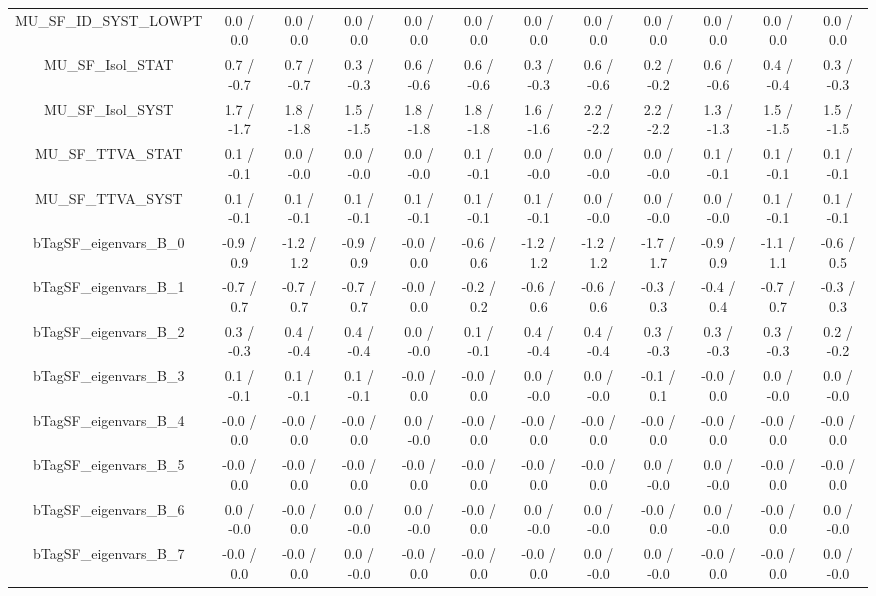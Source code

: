 \begin{table}[htbp]
\begin{center}
\begin{tabular}{|c|c|c|c|c|c|c|c|c|c|c|c|}
  MU_SF_ID_SYST_LOWPT & 0.0 / 0.0 & 0.0 / 0.0 & 0.0 / 0.0 & 0.0 / 0.0 & 0.0 / 0.0 & 0.0 / 0.0 & 0.0 / 0.0 & 0.0 / 0.0 & 0.0 / 0.0 & 0.0 / 0.0 & 0.0 / 0.0 \\ 
  MU_SF_Isol_STAT & 0.7 / -0.7 & 0.7 / -0.7 & 0.3 / -0.3 & 0.6 / -0.6 & 0.6 / -0.6 & 0.3 / -0.3 & 0.6 / -0.6 & 0.2 / -0.2 & 0.6 / -0.6 & 0.4 / -0.4 & 0.3 / -0.3 \\ 
  MU_SF_Isol_SYST & 1.7 / -1.7 & 1.8 / -1.8 & 1.5 / -1.5 & 1.8 / -1.8 & 1.8 / -1.8 & 1.6 / -1.6 & 2.2 / -2.2 & 2.2 / -2.2 & 1.3 / -1.3 & 1.5 / -1.5 & 1.5 / -1.5 \\ 
  MU_SF_TTVA_STAT & 0.1 / -0.1 & 0.0 / -0.0 & 0.0 / -0.0 & 0.0 / -0.0 & 0.1 / -0.1 & 0.0 / -0.0 & 0.0 / -0.0 & 0.0 / -0.0 & 0.1 / -0.1 & 0.1 / -0.1 & 0.1 / -0.1 \\ 
  MU_SF_TTVA_SYST & 0.1 / -0.1 & 0.1 / -0.1 & 0.1 / -0.1 & 0.1 / -0.1 & 0.1 / -0.1 & 0.1 / -0.1 & 0.0 / -0.0 & 0.0 / -0.0 & 0.0 / -0.0 & 0.1 / -0.1 & 0.1 / -0.1 \\ 
  bTagSF_eigenvars_B_0 & -0.9 / 0.9 & -1.2 / 1.2 & -0.9 / 0.9 & -0.0 / 0.0 & -0.6 / 0.6 & -1.2 / 1.2 & -1.2 / 1.2 & -1.7 / 1.7 & -0.9 / 0.9 & -1.1 / 1.1 & -0.6 / 0.5 \\ 
  bTagSF_eigenvars_B_1 & -0.7 / 0.7 & -0.7 / 0.7 & -0.7 / 0.7 & -0.0 / 0.0 & -0.2 / 0.2 & -0.6 / 0.6 & -0.6 / 0.6 & -0.3 / 0.3 & -0.4 / 0.4 & -0.7 / 0.7 & -0.3 / 0.3 \\ 
  bTagSF_eigenvars_B_2 & 0.3 / -0.3 & 0.4 / -0.4 & 0.4 / -0.4 & 0.0 / -0.0 & 0.1 / -0.1 & 0.4 / -0.4 & 0.4 / -0.4 & 0.3 / -0.3 & 0.3 / -0.3 & 0.3 / -0.3 & 0.2 / -0.2 \\ 
  bTagSF_eigenvars_B_3 & 0.1 / -0.1 & 0.1 / -0.1 & 0.1 / -0.1 & -0.0 / 0.0 & -0.0 / 0.0 & 0.0 / -0.0 & 0.0 / -0.0 & -0.1 / 0.1 & -0.0 / 0.0 & 0.0 / -0.0 & 0.0 / -0.0 \\ 
  bTagSF_eigenvars_B_4 & -0.0 / 0.0 & -0.0 / 0.0 & -0.0 / 0.0 & 0.0 / -0.0 & -0.0 / 0.0 & -0.0 / 0.0 & -0.0 / 0.0 & -0.0 / 0.0 & -0.0 / 0.0 & -0.0 / 0.0 & -0.0 / 0.0 \\ 
  bTagSF_eigenvars_B_5 & -0.0 / 0.0 & -0.0 / 0.0 & -0.0 / 0.0 & -0.0 / 0.0 & -0.0 / 0.0 & -0.0 / 0.0 & -0.0 / 0.0 & 0.0 / -0.0 & 0.0 / -0.0 & -0.0 / 0.0 & -0.0 / 0.0 \\ 
  bTagSF_eigenvars_B_6 & 0.0 / -0.0 & -0.0 / 0.0 & 0.0 / -0.0 & 0.0 / -0.0 & -0.0 / 0.0 & 0.0 / -0.0 & 0.0 / -0.0 & -0.0 / 0.0 & 0.0 / -0.0 & -0.0 / 0.0 & 0.0 / -0.0 \\ 
  bTagSF_eigenvars_B_7 & -0.0 / 0.0 & -0.0 / 0.0 & 0.0 / -0.0 & -0.0 / 0.0 & -0.0 / 0.0 & -0.0 / 0.0 & 0.0 / -0.0 & 0.0 / -0.0 & -0.0 / 0.0 & -0.0 / 0.0 & 0.0 / -0.0 \\ 

\end{tabular}
\end{center}
\end{table}
